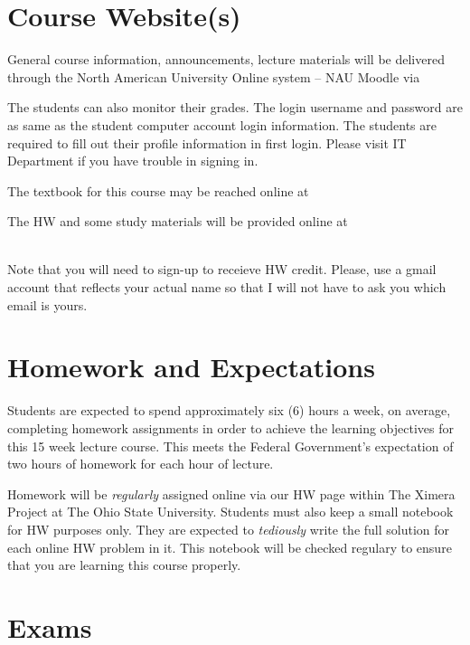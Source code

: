 \documentclass[handout]{ximera}
\begin{document}
\section*{Course Website(s)}

General course information, announcements, lecture materials will be delivered through the North American University Online system – NAU Moodle via 


The students can also monitor their grades. The login username and password are as same as the student computer account login information. The students are required to fill out their profile information in first login. Please visit IT Department if you have trouble in signing in.

The textbook for this course may be reached online at 


The HW and some study materials will be provided online at 

\\
Note that you will need to sign-up to receieve HW credit. Please, use a gmail account that reflects your actual name so that I will not have to ask you which email is yours.

\section*{Homework and Expectations}

Students are expected to spend approximately six (6) hours a week, on average, completing homework assignments in order to achieve the learning objectives for this 15 week lecture course. This meets the Federal Government’s expectation of two hours of homework for each hour of lecture. 

Homework will be {\it regularly} assigned online via our HW page within The Ximera Project at The Ohio State University. Students must also keep a small notebook for HW purposes only. They are expected to {\it tediously} write the full solution for each online HW problem in it. This notebook will be checked regulary to ensure that you are learning this course properly. 

\section*{Exams}
\end{document}
